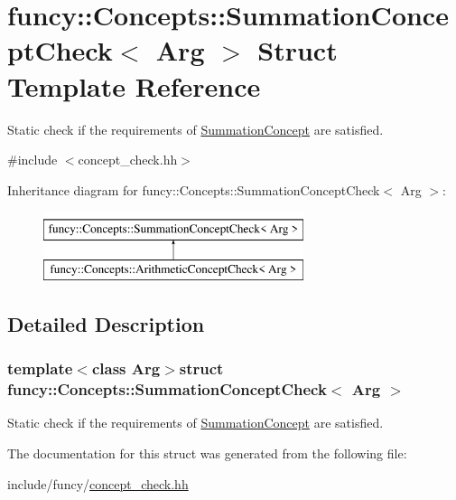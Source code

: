 \hypertarget{structfuncy_1_1Concepts_1_1SummationConceptCheck}{\section{funcy\-:\-:Concepts\-:\-:Summation\-Concept\-Check$<$ Arg $>$ Struct Template Reference}
\label{structfuncy_1_1Concepts_1_1SummationConceptCheck}
}


Static check if the requirements of \hyperlink{structfuncy_1_1Concepts_1_1SummationConcept}{Summation\-Concept} are satisfied.  




{\ttfamily \#include $<$concept\-\_\-check.\-hh$>$}

Inheritance diagram for funcy\-:\-:Concepts\-:\-:Summation\-Concept\-Check$<$ Arg $>$\-:\begin{figure}[H]
\begin{center}
\leavevmode
\includegraphics[height=2.000000cm]{structfuncy_1_1Concepts_1_1SummationConceptCheck}
\end{center}
\end{figure}


\subsection{Detailed Description}
\subsubsection*{template$<$class Arg$>$struct funcy\-::\-Concepts\-::\-Summation\-Concept\-Check$<$ Arg $>$}

Static check if the requirements of \hyperlink{structfuncy_1_1Concepts_1_1SummationConcept}{Summation\-Concept} are satisfied. 

The documentation for this struct was generated from the following file\-:\begin{DoxyCompactItemize}
\item 
include/funcy/\hyperlink{concept__check_8hh}{concept\-\_\-check.\-hh}\end{DoxyCompactItemize}

